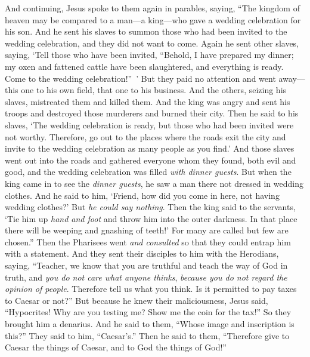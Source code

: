 \begin{biblechapter} %
 And continuing, Jesus spoke to them again in parables, saying,
\verse “The kingdom of heaven may be compared to a man—a king—who gave a wedding celebration for his son.
\verse And he sent his slaves to summon those who had been invited to the wedding celebration, and they did not want to come.
\verse Again he sent other slaves, saying, ‘Tell those who have been invited, “Behold, I have prepared my dinner; my oxen and fattened cattle have been slaughtered, and everything is ready. Come to the wedding celebration!” ’
\verse But they paid no attention and went away—this one to his own field, that one to his business.
\verse And the others, seizing his slaves, mistreated them and killed them.
\verse And the king was angry and sent his troops and destroyed those murderers and burned their city.
\verse Then he said to his slaves, ‘The wedding celebration is ready, but those who had been invited were not worthy.
\verse Therefore, go out to the places where the roads exit the city and invite to the wedding celebration as many people as you find.’
\verse And those slaves went out into the roads and gathered everyone whom they found, both evil and good, and the wedding celebration was filled \textit{with dinner guests}.
\verse But when the king came in to see the \textit{dinner guests}, he saw a man there not dressed in wedding clothes.
\verse And he said to him, ‘Friend, how did you come in here, not having wedding clothes?’ But \textit{he could say nothing}.
\verse Then the king said to the servants, ‘Tie him up \textit{hand and foot} and throw him into the outer darkness. In that place there will be weeping and gnashing of teeth!’
\verse For many are called but few are chosen.”
 Then the Pharisees went \textit{and consulted} so that they could entrap him with a statement.
\verse And they sent their disciples to him with the Herodians, saying, “Teacher, we know that you are truthful and teach the way of God in truth, and \textit{you do not care what anyone thinks}, \textit{because you do not regard the opinion of people}.
\verse Therefore tell us what you think. Is it permitted to pay taxes to Caesar or not?”
\verse But because he knew their maliciousness, Jesus said, “Hypocrites! Why are you testing me?
\verse Show me the coin for the tax!” So they brought him a denarius.
\verse And he said to them, “Whose image and inscription is this?”
\verse They said to him, “Caesar’s.” Then he said to them, “Therefore give to Caesar the things of Caesar, and to God the things of God!”

\end{biblechapter}
